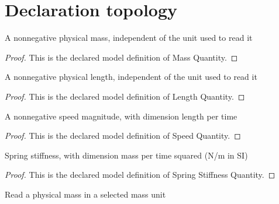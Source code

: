 \section{Declaration topology}
\begin{definition}
  \label{def:physics:phyx-mini-0260:phyxminiproblems-problemphyxmini0260-massquantity}
  A nonnegative physical mass, independent of the unit used to read it
\end{definition}
\begin{proof}
  This is the declared model definition of Mass Quantity.
\end{proof}
\begin{definition}
  \label{def:physics:phyx-mini-0260:phyxminiproblems-problemphyxmini0260-lengthquantity}
  A nonnegative physical length, independent of the unit used to read it
\end{definition}
\begin{proof}
  This is the declared model definition of Length Quantity.
\end{proof}
\begin{definition}
  \label{def:physics:phyx-mini-0260:phyxminiproblems-problemphyxmini0260-speedquantity}
  A nonnegative speed magnitude, with dimension length per time
\end{definition}
\begin{proof}
  This is the declared model definition of Speed Quantity.
\end{proof}
\begin{definition}
  \label{def:physics:phyx-mini-0260:phyxminiproblems-problemphyxmini0260-springstiffnessquantity}
  Spring stiffness, with dimension mass per time squared (N/m in SI)
\end{definition}
\begin{proof}
  This is the declared model definition of Spring Stiffness Quantity.
\end{proof}
\begin{definition}
  \label{def:physics:phyx-mini-0260:phyxminiproblems-problemphyxmini0260-massreadout}
  Read a physical mass in a selected mass unit
\end{definition}
